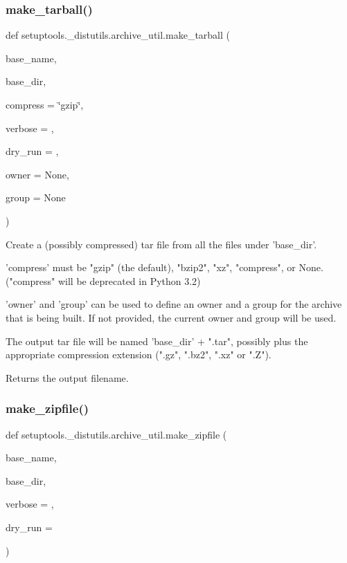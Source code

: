 \subsubsection{\texorpdfstring{make\+\_\+tarball()}{make\_tarball()}}
{\footnotesize\ttfamily def setuptools.\+\_\+distutils.\+archive\+\_\+util.\+make\+\_\+tarball (\begin{DoxyParamCaption}\item[{}]{base\+\_\+name,  }\item[{}]{base\+\_\+dir,  }\item[{}]{compress = {\ttfamily \char`\"{}gzip\char`\"{}},  }\item[{}]{verbose = {},  }\item[{}]{dry\+\_\+run = {},  }\item[{}]{owner = {\ttfamily None},  }\item[{}]{group = {\ttfamily None} }\end{DoxyParamCaption})}

\begin{DoxyVerb}Create a (possibly compressed) tar file from all the files under
'base_dir'.

'compress' must be "gzip" (the default), "bzip2", "xz", "compress", or
None.  ("compress" will be deprecated in Python 3.2)

'owner' and 'group' can be used to define an owner and a group for the
archive that is being built. If not provided, the current owner and group
will be used.

The output tar file will be named 'base_dir' +  ".tar", possibly plus
the appropriate compression extension (".gz", ".bz2", ".xz" or ".Z").

Returns the output filename.
\end{DoxyVerb}
 \mbox{\label{namespacesetuptools_1_1__distutils_1_1archive__util_a38983f08433f7de571d0eef0831aa651}} 
\subsubsection{\texorpdfstring{make\+\_\+zipfile()}{make\_zipfile()}}
{\footnotesize\ttfamily def setuptools.\+\_\+distutils.\+archive\+\_\+util.\+make\+\_\+zipfile (\begin{DoxyParamCaption}\item[{}]{base\+\_\+name,  }\item[{}]{base\+\_\+dir,  }\item[{}]{verbose = {},  }\item[{}]{dry\+\_\+run = {} }\end{DoxyParamCaption})}

